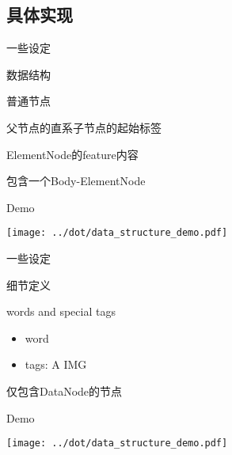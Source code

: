 \documentclass{beamer}
\begin{document}
\subsection{具体实现}
\begin{frame}{一些设定}
    \begin{center}
    \begin{overprint}
        \begin{block}{数据结构}
            \begin{description}
                \item [ElementNode] 普通节点
                \item [StyleNode] 父节点的直系子节点的起始标签
                \item [DataNode] ElementNode的feature内容
                \item [StyleTree] 包含一个Body-ElementNode
            \end{description}
        \end{block}

        \begin{block}{Demo}
            \begin{center}
            \texttt{[image: ../dot/data\_structure\_demo.pdf]}
            \end{center}
        \end{block}
    \end{overprint}
    \end{center}
\end{frame}

\begin{frame}{一些设定}
    \begin{center}
    \begin{overprint}
        \begin{block}{细节定义}
            \begin{description}
            \item [features] words and special tags
                \begin{itemize}
                \item word
                \item tags: A IMG 
                \end{itemize}
            \item [leaf node] 仅包含DataNode的节点
            \end{description}
        \end{block}

        \begin{block}{Demo}
            \begin{center}
            \texttt{[image: ../dot/data\_structure\_demo.pdf]}
            \end{center}
        \end{block}
    \end{overprint}
    \end{center}
\end{frame}
\end{document}
